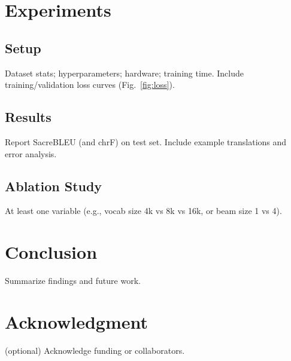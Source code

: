 \documentclass[conference]{IEEEtran}
\begin{document}
\section{Experiments}
\subsection{Setup}
Dataset stats; hyperparameters; hardware; training time. Include training/validation loss curves (Fig.~\ref{fig:loss}).

\subsection{Results}
Report SacreBLEU (and chrF) on test set. Include example translations and error analysis.

\subsection{Ablation Study}
At least one variable (e.g., vocab size 4k vs 8k vs 16k, or beam size 1 vs 4).

\section{Conclusion}
Summarize findings and future work.

\section*{Acknowledgment}
(optional) Acknowledge funding or collaborators.



\end{document}
